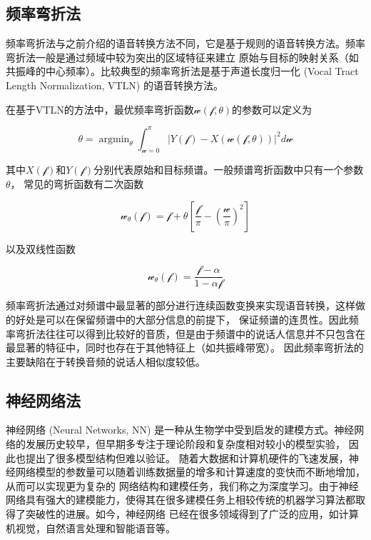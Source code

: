 \subsection{频率弯折法}
频率弯折法与之前介绍的语音转换方法不同，它是基于规则的语音转换方法。频率弯折法一般是通过频域中较为突出的区域特征来建立
原始与目标的映射关系（如共振峰的中心频率）。比较典型的频率弯折法是基于声道长度归一化 (Vocal Tract Length Normalization, VTLN) 的语音转换方法。

在基于VTLN的方法中，最优频率弯折函数$\mathcal{w}(\mathcal{f}, \theta)$的参数可以定义为

\begin{equation}
    \theta = \mathop{\arg\min}_{\theta}\int^{\pi}_{\mathcal{w}=0}\left| Y(\mathcal{f})-X(\mathcal{w}(\mathcal{f},\theta)) \right|^2 d\mathcal{w}
\end{equation}

其中$X(\mathcal{f})$和$Y(\mathcal{f})$分别代表原始和目标频谱。一般频谱弯折函数中只有一个参数$\theta$，
常见的弯折函数有二次函数

\begin{equation}
    \mathcal{w}_{\theta}(\mathcal{f}) = \mathcal{f} + \theta\left[ \frac{\mathcal{f}}{\pi}-(\frac{\mathcal{w}}{\pi})^2 \right]  
\end{equation}

以及双线性函数

\begin{equation}
    \mathcal{w}_{\theta}(\mathcal{f}) = \frac{\mathcal{f}-\alpha}{1-\alpha \mathcal{f}}
\end{equation}

频率弯折法通过对频谱中最显著的部分进行连续函数变换来实现语音转换，这样做的好处是可以在保留频谱中的大部分信息的前提下，
保证频谱的连贯性。因此频率弯折法往往可以得到比较好的音质，但是由于频谱中的说话人信息并不只包含在最显著的特征中，同时也存在于其他特征上（如共振峰带宽）。
因此频率弯折法的主要缺陷在于转换音频的说话人相似度较低。

\subsection{神经网络法}
神经网络 (Neural Networks, NN) 是一种从生物学中受到启发的建模方式。神经网络的发展历史较早，但早期多专注于理论阶段和复杂度相对较小的模型实验，
因此也提出了很多模型结构但难以验证。
随着大数据和计算机硬件的飞速发展，神经网络模型的参数量可以随着训练数据量的增多和计算速度的变快而不断地增加，从而可以实现更为复杂的
网络结构和建模任务，我们称之为深度学习。由于神经网络具有强大的建模能力，使得其在很多建模任务上相较传统的机器学习算法都取得了突破性的进展。如今，神经网络
已经在很多领域得到了广泛的应用，如计算机视觉，自然语言处理和智能语音等。

